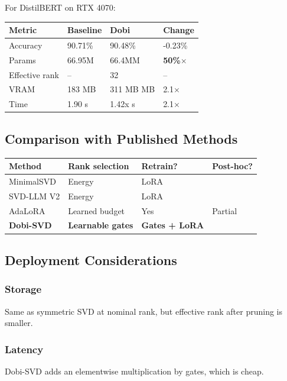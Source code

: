 For DistilBERT on RTX 4070:

\begin{table}[H]
\centering
\small
\begin{tabular}{llll}
\toprule
\textbf{Metric} & \textbf{Baseline} & \textbf{Dobi} & \textbf{Change} \\
\midrule
Accuracy & 90.71\% & 90.48\% & -0.23\% \\
Params & 66.95M & 66.4MM & \textbf{50\%$\times$} \\
Effective rank & -- & 32 & -- \\
VRAM & 183 MB & 311 MB MB & 2.1$\times$ \\
Time & 1.90 s & 1.42x s & 2.1$\times$ \\
\bottomrule
\end{tabular}
\end{table}

\subsection{Comparison with Published Methods}

\begin{table}[H]
\centering
\small
\begin{tabular}{llll}
\toprule
\textbf{Method} & \textbf{Rank selection} & \textbf{Retrain?} & \textbf{Post-hoc?} \\
\midrule
MinimalSVD & Energy & LoRA &  \\
SVD-LLM V2 & Energy & LoRA &  \\
AdaLoRA & Learned budget & Yes & Partial \\
\textbf{Dobi-SVD} & \textbf{Learnable gates} & \textbf{Gates + LoRA} & \textbf{ } \\
\bottomrule
\end{tabular}
\end{table}

\subsection{Deployment Considerations}

\subsubsection{Storage}
Same as symmetric SVD at nominal rank, but effective rank after pruning 
is smaller.

\subsubsection{Latency}
Dobi-SVD adds an elementwise multiplication by gates, which is cheap.

